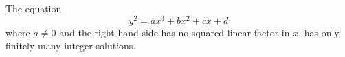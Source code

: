 \begin{proposition}
    The equation
\[
    y^2=ax^3+bx^2+cx+d
\]
    where $a\ne0$ and the right-hand side has no squared linear factor in $x$, has only finitely many integer solutions.
\end{proposition}
